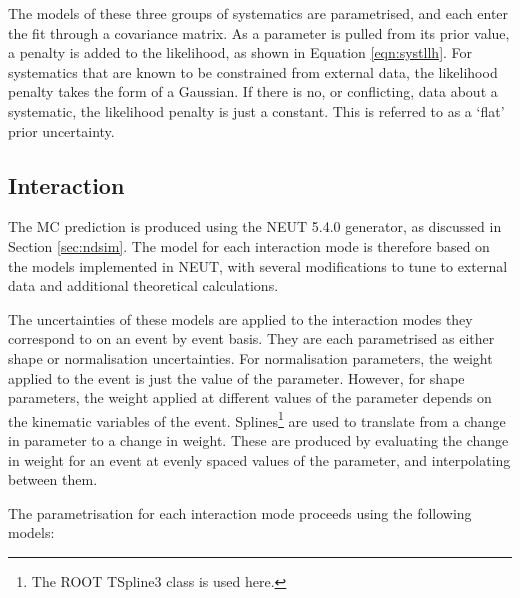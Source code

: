 The models of these three groups of systematics are parametrised, and each enter the fit through a covariance matrix. As a parameter is pulled from its prior value, a penalty is added to the likelihood, as shown in Equation \ref{eqn:systllh}. For systematics that are known to be constrained from external data, the likelihood penalty takes the form of a Gaussian. If there is no, or conflicting, data about a systematic, the likelihood penalty is just a constant. This is referred to as a `flat' prior uncertainty.

\subsection{Interaction}\label{sec:xsec}

The MC prediction is produced using the \textsc{NEUT} 5.4.0 generator\cite{neut}, as discussed in Section \ref{sec:ndsim}. The model for each interaction mode is therefore based on the models implemented in \textsc{NEUT}, with several modifications to tune to external data and additional theoretical calculations.

The uncertainties of these models are applied to the interaction modes they correspond to on an event by event basis. They are each parametrised as either shape or normalisation uncertainties. For normalisation parameters, the weight applied to the event is just the value of the parameter. However, for shape parameters, the weight applied at different values of the parameter depends on the kinematic variables of the event. Splines\footnote{The ROOT TSpline3 class is used here.} are used to translate from a change in parameter to a change in weight. These are produced by evaluating the change in weight for an event at evenly spaced values of the parameter, and interpolating between them. 

The parametrisation for each interaction mode proceeds using the following models:


